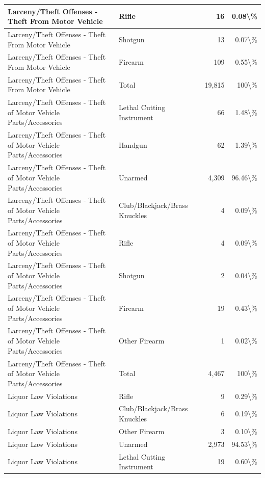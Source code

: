 \documentclass[
]{krantz}
\begin{document}
\begin{longtable}[t]{l|l|r|r}
\hline
Larceny/Theft Offenses - Theft From Motor Vehicle & Rifle & 16 & 0.08\textbackslash{}\%\\
\hline
Larceny/Theft Offenses - Theft From Motor Vehicle & Shotgun & 13 & 0.07\textbackslash{}\%\\
\hline
Larceny/Theft Offenses - Theft From Motor Vehicle & Firearm & 109 & 0.55\textbackslash{}\%\\
\hline
Larceny/Theft Offenses - Theft From Motor Vehicle & Total & 19,815 & 100\textbackslash{}\%\\
\hline
Larceny/Theft Offenses - Theft of Motor Vehicle Parts/Accessories & Lethal Cutting Instrument & 66 & 1.48\textbackslash{}\%\\
\hline
Larceny/Theft Offenses - Theft of Motor Vehicle Parts/Accessories & Handgun & 62 & 1.39\textbackslash{}\%\\
\hline
Larceny/Theft Offenses - Theft of Motor Vehicle Parts/Accessories & Unarmed & 4,309 & 96.46\textbackslash{}\%\\
\hline
Larceny/Theft Offenses - Theft of Motor Vehicle Parts/Accessories & Club/Blackjack/Brass Knuckles & 4 & 0.09\textbackslash{}\%\\
\hline
Larceny/Theft Offenses - Theft of Motor Vehicle Parts/Accessories & Rifle & 4 & 0.09\textbackslash{}\%\\
\hline
Larceny/Theft Offenses - Theft of Motor Vehicle Parts/Accessories & Shotgun & 2 & 0.04\textbackslash{}\%\\
\hline
Larceny/Theft Offenses - Theft of Motor Vehicle Parts/Accessories & Firearm & 19 & 0.43\textbackslash{}\%\\
\hline
Larceny/Theft Offenses - Theft of Motor Vehicle Parts/Accessories & Other Firearm & 1 & 0.02\textbackslash{}\%\\
\hline
Larceny/Theft Offenses - Theft of Motor Vehicle Parts/Accessories & Total & 4,467 & 100\textbackslash{}\%\\
\hline
Liquor Law Violations & Rifle & 9 & 0.29\textbackslash{}\%\\
\hline
Liquor Law Violations & Club/Blackjack/Brass Knuckles & 6 & 0.19\textbackslash{}\%\\
\hline
Liquor Law Violations & Other Firearm & 3 & 0.10\textbackslash{}\%\\
\hline
Liquor Law Violations & Unarmed & 2,973 & 94.53\textbackslash{}\%\\
\hline
Liquor Law Violations & Lethal Cutting Instrument & 19 & 0.60\textbackslash{}\%\\
\hline

\end{longtable}
\end{document}
